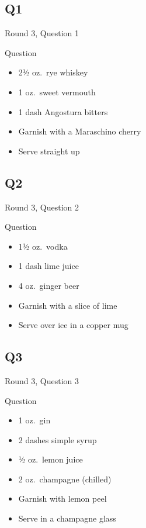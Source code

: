\documentclass[11pt]{beamer}
\begin{document}
\subsection*{Q1}
\begin{frame}[t]{Round 3, Question 1}
\begin{block}{Question}
\begin{itemize}
\item 2½ oz.\ rye whiskey
\item 1 oz.\ sweet vermouth
\item 1 dash Angostura bitters
\item Garnish with a Maraschino cherry
\item Serve straight up
\end{itemize}
\end{block}
\end{frame}
\subsection*{Q2}
\begin{frame}[t]{Round 3, Question 2}
\begin{block}{Question}
\begin{itemize}
\item 1½ oz.\ vodka
\item 1 dash lime juice
\item 4 oz.\ ginger beer
\item Garnish with a slice of lime
\item Serve over ice in a copper mug
\end{itemize}
\end{block}
\end{frame}
\subsection*{Q3}
\begin{frame}[t]{Round 3, Question 3}
\begin{block}{Question}
\begin{itemize}
\item 1 oz.\ gin
\item 2 dashes simple syrup
\item ½ oz.\ lemon juice
\item 2 oz.\ champagne (chilled)
\item Garnish with lemon peel
\item Serve in a champagne glass
\end{itemize}
\end{block}
\end{frame}
\end{document}
